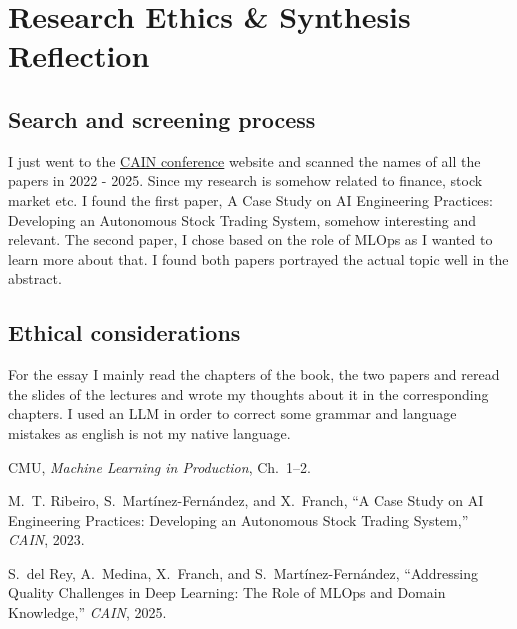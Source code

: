 \documentclass[11pt,a4paper]{article}
\begin{document}
\section{Research Ethics \& Synthesis Reflection}
\subsection{Search and screening process}
I just went to the \href{https://conf.researchr.org/series/cain}{CAIN conference} website and scanned the names of all the papers in 2022 - 2025. Since my research is somehow related to finance, stock market etc. I found the first paper, A Case Study on AI Engineering Practices:
Developing an Autonomous Stock Trading System, somehow interesting and relevant. The second paper, I chose based on the role of MLOps as I wanted to learn more about that. I found both papers portrayed the actual topic well in the abstract. 

\subsection{Ethical considerations}
For the essay I mainly read the chapters of the book, the two papers and reread the slides of the lectures and wrote my thoughts about it in the corresponding chapters. I used an LLM in order to correct some grammar and language mistakes as english is not my native language. 



\begin{thebibliography}{9}\setlength{\itemsep}{0pt}
CMU, \emph{Machine Learning in Production}, Ch.~1--2.

M.~T. Ribeiro, S.~Martínez-Fernández, and X.~Franch, 
``A Case Study on AI Engineering Practices: Developing an Autonomous Stock Trading System,'' 
\emph{CAIN}, 2023.

S.~del Rey, A.~Medina, X.~Franch, and S.~Martínez-Fernández, 
``Addressing Quality Challenges in Deep Learning: The Role of MLOps and Domain Knowledge,'' 
\emph{CAIN}, 2025.
\end{thebibliography}
\end{document}
